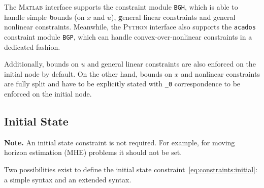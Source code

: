 \documentclass[english]{article}
\newcommand{\code}[1]{\texttt{#1}}
\newcommand{\str}[1]{\texttt{'#1'}}
\newcommand{\acados}{\texttt{acados}}
\newcommand{\matlab}{\textsc{Matlab}}
\newcommand{\python}{\textsc{Python}}
\begin{document}
The \matlab{} interface supports the constraint module \code{BGH}, which is able to handle simple \textbf{b}ounds (on $ x $ and $ u $), \textbf{g}eneral linear constraints and general nonlinear constraints.
Meanwhile, the \python{} interface also supports the \acados{} constraint module \code{BGP}, which can handle convex-over-nonlinear constraints in a dedicated fashion.

Additionally, bounds on $u$ and general linear constraints are also enforced on the initial node by default.
On the other hand, bounds on $x$ and nonlinear constraints are fully split and have to be explicitly stated with \code{\_0} correspondence to be enforced on the initial node.

%
\subsection{Initial State}\label{sec:constraints:initial}
%
\textbf{Note.} An initial state constraint is not required.
For example, for moving horizon estimation (MHE) problems it should not be set.

Two possibilities exist to define the initial state constraint~\eqref{eq:constraints:initial}: a simple syntax and an extended syntax.
\end{document}
